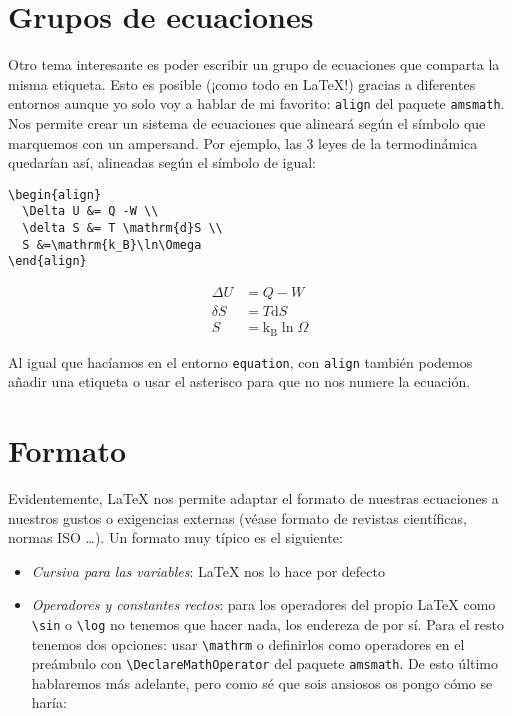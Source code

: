 \section{Grupos de ecuaciones}\label{sec:gruposEc}

Otro tema interesante es poder escribir un grupo de ecuaciones que
comparta la misma etiqueta. Esto es posible (¡como todo en LaTeX!)
gracias a diferentes entornos aunque yo solo voy a hablar de mi
favorito: \lstinline!align! del paquete \lstinline!amsmath!. Nos permite
crear un sistema de ecuaciones que alineará según el símbolo que
marquemos con un ampersand. Por ejemplo, las 3 leyes de la termodinámica
quedarían así, alineadas según el símbolo de igual:

\begin{lstlisting}[language={[latex]tex}]
\begin{align}
  \Delta U &= Q -W \\
  \delta S &= T \mathrm{d}S \\
  S &=\mathrm{k_B}\ln\Omega
\end{align}
\end{lstlisting}

\begin{align*}
  \Delta U &= Q -W \\
  \delta S &= T \mathrm{d}S \\
  S &=\mathrm{k_B}\ln\Omega
\end{align*}

Al igual que hacíamos en el entorno \lstinline!equation!, con
\lstinline!align! también podemos añadir una etiqueta o usar el
asterisco para que no nos numere la ecuación.

\section{Formato}\label{sec:formato}

Evidentemente, LaTeX nos permite adaptar el formato de nuestras
ecuaciones a nuestros gustos o exigencias externas (véase formato de
revistas científicas, normas ISO \ldots{}). Un formato muy típico es el
siguiente:

\begin{itemize}
\item
  \emph{Cursiva para las variables}: LaTeX nos lo hace por defecto
\item
  \emph{Operadores y constantes rectos}: para los operadores del propio
  LaTeX como \lstinline!\sin! o \lstinline!\log! no tenemos que hacer
  nada, los endereza de por sí. Para el resto tenemos dos opciones: usar
  \lstinline!\mathrm! o definirlos como operadores en el preámbulo con
  \lstinline!\DeclareMathOperator! del paquete \lstinline!amsmath!. De
  esto último hablaremos más adelante, pero como sé que sois ansiosos os
  pongo cómo se haría:
\end{itemize}

